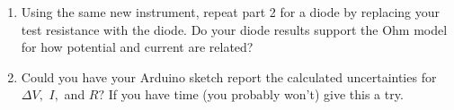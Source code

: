 \begin{enumerate}
\begin{enumerate}
	\item Compare your data and conclusions to the data and conclusions of your lab group members. Have them look at your results as well.
\end{enumerate}

	\item Using the same new instrument, repeat part 2 for a diode by replacing your test resistance with the diode. Do your diode results support the Ohm model for how potential and current are related?

	\item Could you have your Arduino sketch report the calculated uncertainties for $\Delta V,$ $I,$ and $R?$ If you have time (you probably won't) give this a try.
\end{enumerate}


\vfill

